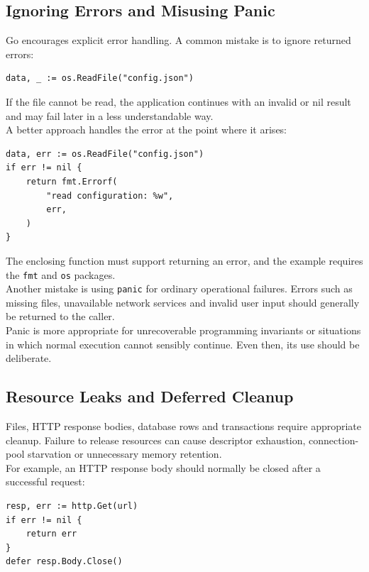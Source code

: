 \subsection{Ignoring Errors and Misusing Panic}

Go encourages explicit error handling. A common mistake is to ignore returned errors:

\begin{lstlisting}
data, _ := os.ReadFile("config.json")
\end{lstlisting}

If the file cannot be read, the application continues with an invalid or nil result and may fail later in a less understandable way.\\

A better approach handles the error at the point where it arises:

\begin{lstlisting}
data, err := os.ReadFile("config.json")
if err != nil {
    return fmt.Errorf(
        "read configuration: %w",
        err,
    )
}
\end{lstlisting}

The enclosing function must support returning an error, and the example requires the \texttt{fmt} and \texttt{os} packages.\\

Another mistake is using \texttt{panic} for ordinary operational failures. Errors such as missing files, unavailable network services and invalid user input should generally be returned to the caller.\\

Panic is more appropriate for unrecoverable programming invariants or situations in which normal execution cannot sensibly continue. Even then, its use should be deliberate.

\subsection{Resource Leaks and Deferred Cleanup}

Files, HTTP response bodies, database rows and transactions require appropriate cleanup. Failure to release resources can cause descriptor exhaustion, connection-pool starvation or unnecessary memory retention.\\

For example, an HTTP response body should normally be closed after a successful request:

\begin{lstlisting}
resp, err := http.Get(url)
if err != nil {
    return err
}
defer resp.Body.Close()
\end{lstlisting}


